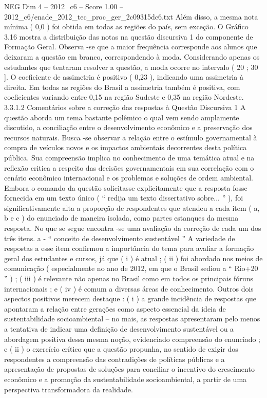 \begin{textsample}{NEG Dim 4 – 2012\_c6 – Score 1.00 – 2012\_c6/enade\_2012\_tec\_proc\_ger\_2c09315dc6.txt}
Além disso, a mesma nota mínima ( 0,0 ) foi obtida em todas as regiões do país, sem exceção.
O Gráfico 3.16 mostra a distribuição das notas na questão discursiva 1 do componente de Formação Geral.
Observa -se que a maior frequência corresponde aos alunos que deixaram a questão em branco, correspondendo à moda.
Considerando apenas os estudantes que tentaram resolver a questão, a moda ocorre no intervalo ( 20 ; 30 ].
O coeficiente de assimetria é positivo ( 0,23 ), indicando uma assimetria à direita.
Em todas as regiões do Brasil a assimetria também é positiva, com coeficientes variando entre 0,15 na região Sudeste e 0,35 na região Nordeste. 3.3.1.2 Comentários sobre a correção das respostas à Questão Discursiva 1 A questão aborda um tema bastante polêmico o qual vem sendo amplamente discutido, a conciliação entre o desenvolvimento econômico e a preservação dos recursos naturais.
Busca -se observar a relação entre o estímulo governamental à compra de veículos novos e os impactos ambientais decorrentes desta política pública.
Sua compreensão implica no conhecimento de uma temática atual e na reflexão critica a respeito das decisões governamentais em sua correlação com o cenário econômico internacional e os problemas e soluções de ordem ambiental.
Embora o comando da questão solicitasse explicitamente que a resposta fosse fornecida em um texto único ( “ redija um texto dissertativo sobre... ” ), foi significativamente alta a proporção de respondentes que atendeu a cada item ( a, b e c ) do enunciado de maneira isolada, como partes estanques da mesma resposta.
No que se segue encontra -se uma avaliação da correção de cada um dos três itens. a - “ conceito de desenvolvimento sustentável ” A variedade de respostas a esse item confirmou a importância do tema para avaliar a formação geral dos estudantes e cursos, já que ( i ) é atual ; ( ii ) foi abordado nos meios de comunicação ( especialmente no ano de 2012, em que o Brasil sediou a “ Rio+20 ” ) ; ( iii ) é relevante não apenas no Brasil como em todos os principais fóruns internacionais ; e ( iv ) é comum a diversas áreas de conhecimento.
Outros dois aspectos positivos merecem destaque : ( i ) a grande incidência de respostas que apontaram a relação entre gerações como aspecto essencial da ideia de sustentabilidade socioambiental – no mais, as respostas apresentaram pelo menos a tentativa de indicar uma definição de desenvolvimento sustentável ou a abordagem positiva dessa mesma noção, evidenciado compreensão do enunciado ; e ( ii ) o exercício crítico que a questão propunha, no sentido de exigir dos respondentes a compreensão das contradições de políticas públicas e a apresentação de propostas de soluções para conciliar o incentivo do crescimento econômico e a promoção da sustentabilidade socioambiental, a partir de uma perspectiva transformadora da realidade.

\end{textsample}
